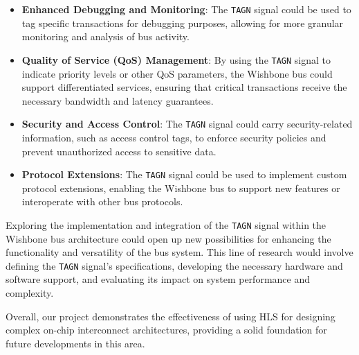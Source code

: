 \documentclass[12pt]{report}
\begin{document}
\begin{itemize}
    \item \textbf{Enhanced Debugging and Monitoring}: The \texttt{TAGN} signal could be used to tag specific transactions for debugging purposes, allowing for more granular monitoring and analysis of bus activity.
    \item \textbf{Quality of Service (QoS) Management}: By using the \texttt{TAGN} signal to indicate priority levels or other QoS parameters, the Wishbone bus could support differentiated services, ensuring that critical transactions receive the necessary bandwidth and latency guarantees.
    \item \textbf{Security and Access Control}: The \texttt{TAGN} signal could carry security-related information, such as access control tags, to enforce security policies and prevent unauthorized access to sensitive data.
    \item \textbf{Protocol Extensions}: The \texttt{TAGN} signal could be used to implement custom protocol extensions, enabling the Wishbone bus to support new features or interoperate with other bus protocols.
\end{itemize}

Exploring the implementation and integration of the \texttt{TAGN} signal within the Wishbone bus architecture could open up new possibilities for enhancing the functionality and versatility of the bus system. This line of research would involve defining the \texttt{TAGN} signal's specifications, developing the necessary hardware and software support, and evaluating its impact on system performance and complexity.

Overall, our project demonstrates the effectiveness of using HLS for designing complex on-chip interconnect architectures, providing a solid foundation for future developments in this area.





\newpage
\printbibliography[title={References}, resetnumbers=true, heading=subbibliography]
\clearpage
\end{document}

